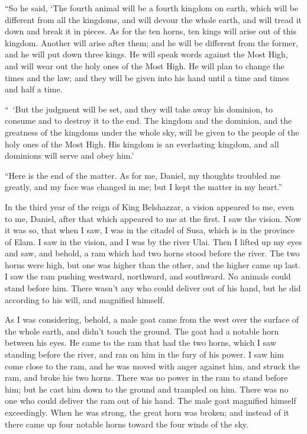 \myverse{}“So he said, ‘The fourth animal will be a fourth kingdom on earth,
which will be different from all the kingdoms, and will devour the whole earth, and will tread it down
and break it in pieces.
\myverse{}As for the ten horns, ten kings will arise out of this kingdom. Another will
arise after them; and he will be different from the former, and he will put down three kings.
\myverse{}He will speak words against the Most High, and will wear out the holy ones
of the Most High. He will plan to change the times and the law; and they will be given into his hand until
a time and times and half a time.

\myverse{}“ ‘But the judgment will be set, and they will take away his dominion,
to consume and to destroy it to the end.
\myverse{}The kingdom and the dominion, and the greatness of the kingdoms under the
whole sky, will be given to the people of the holy ones of the Most High. His kingdom is an everlasting
kingdom, and all dominions will serve and obey him.’

\myverse{}“Here is the end of the matter. As for me, Daniel, my thoughts
troubled me greatly, and my face was changed in me; but I kept the matter in my heart.”


\mychapter{} \myverse*{}In the third year of the reign of King Belshazzar, a vision appeared
to me, even to me, Daniel, after that which appeared to me at the first.
\myverse{}I saw the vision. Now it was so, that when I saw, I was in the citadel of Susa,
which is in the province of Elam. I saw in the vision, and I was by the river Ulai.
\myverse{}Then I lifted up my eyes and saw, and behold, a ram which had two horns stood
before the river. The two horns were high, but one was higher than the other, and the higher came up last.
\myverse{}I saw the ram pushing westward, northward, and southward. No animals could stand
before him. There wasn’t any who could deliver out of his hand, but he did according to his will, and
magnified himself.

\myverse{}As I was considering, behold, a male goat came from the west over
the surface of the whole earth, and didn’t touch the ground. The goat had a notable horn between his eyes.
\myverse{}He came to the ram that had the two horns, which I saw standing before the river,
and ran on him in the fury of his power.
\myverse{}I saw him come close to the ram, and he was moved with anger against him, and
struck the ram, and broke his two horns. There was no power in the ram to stand before him; but he cast
him down to the ground and trampled on him. There was no one who could deliver the ram out of his hand.
\myverse{}The male goat magnified himself exceedingly. When he was strong, the great horn
was broken; and instead of it there came up four notable horns toward the four winds of the sky.

